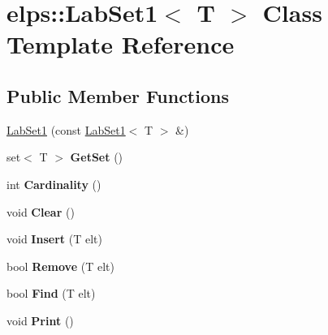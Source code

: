 \hypertarget{classelps_1_1_lab_set1}{\section{elps\-:\-:Lab\-Set1$<$ T $>$ Class Template Reference}
\label{classelps_1_1_lab_set1}
}
\subsection*{Public Member Functions}
\begin{DoxyCompactItemize}
\item 
\hyperlink{classelps_1_1_lab_set1_a615db30364701a0cea588dede18b0ee6}{Lab\-Set1} (const \hyperlink{classelps_1_1_lab_set1}{Lab\-Set1}$<$ T $>$ \&)
\item 
\hypertarget{classelps_1_1_lab_set1_ac3b4a495fa503866258ba309bcc9718c}{set$<$ T $>$ {\bfseries Get\-Set} ()}\label{classelps_1_1_lab_set1_ac3b4a495fa503866258ba309bcc9718c}

\item 
\hypertarget{classelps_1_1_lab_set1_a577e444d7918d077342938e64eb63a24}{int {\bfseries Cardinality} ()}\label{classelps_1_1_lab_set1_a577e444d7918d077342938e64eb63a24}

\item 
\hypertarget{classelps_1_1_lab_set1_a2df7572fbb4dd1e46944c91417beb1cd}{void {\bfseries Clear} ()}\label{classelps_1_1_lab_set1_a2df7572fbb4dd1e46944c91417beb1cd}

\item 
\hypertarget{classelps_1_1_lab_set1_af1f13aaf68e3eb63fc1c950b94304396}{void {\bfseries Insert} (T elt)}\label{classelps_1_1_lab_set1_af1f13aaf68e3eb63fc1c950b94304396}

\item 
\hypertarget{classelps_1_1_lab_set1_aae9a6f1d12c62e13305c19fb3073bc97}{bool {\bfseries Remove} (T elt)}\label{classelps_1_1_lab_set1_aae9a6f1d12c62e13305c19fb3073bc97}

\item 
\hypertarget{classelps_1_1_lab_set1_a688190de58f80831bf49061f64d8dca1}{bool {\bfseries Find} (T elt)}\label{classelps_1_1_lab_set1_a688190de58f80831bf49061f64d8dca1}

\item 
\hypertarget{classelps_1_1_lab_set1_add9651557eccfd15243a518ea77eeb49}{void {\bfseries Print} ()}\label{classelps_1_1_lab_set1_add9651557eccfd15243a518ea77eeb49}


\end{DoxyCompactItemize}
